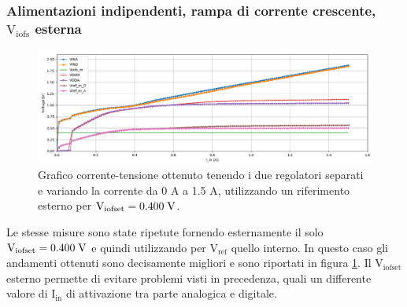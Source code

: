 \subsubsection{Alimentazioni indipendenti, rampa di corrente crescente, $\mathrm{V_{iofs}}$ esterna} 
\begin{figure}
\centering
\includegraphics[width=\textwidth]{Immagini/IUEViofs2}
\caption{Grafico corrente-tensione ottenuto tenendo i due regolatori separati e variando la corrente da 0 A a 1.5 A, utilizzando un riferimento esterno per $\mathrm{V_{iofset}}=0.400 \rm \; V$.}
\label{IUEViofs}
\end{figure}
Le stesse misure sono state ripetute fornendo esternamente il solo $\mathrm{V_{iofset}}=0.400 \rm \; V$ e quindi utilizzando per $\mathrm{V_{ref}}$ quello interno. In questo caso gli andamenti ottenuti sono decisamente migliori e sono riportati in figura \ref{IUEViofs}. 
Il $\mathrm{V_{iofset}}$ esterno permette di evitare problemi visti in precedenza, quali un differente valore di $\mathrm{I_{in}}$ di attivazione tra parte analogica e digitale.  
% 
%
%



